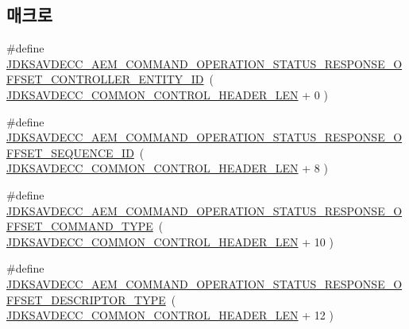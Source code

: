 \subsection*{매크로}
\begin{DoxyCompactItemize}
\item 
\#define \hyperlink{group__command__operation__status__response_ga7ae2781500733544ae98e74ad76cddd2}{J\+D\+K\+S\+A\+V\+D\+E\+C\+C\+\_\+\+A\+E\+M\+\_\+\+C\+O\+M\+M\+A\+N\+D\+\_\+\+O\+P\+E\+R\+A\+T\+I\+O\+N\+\_\+\+S\+T\+A\+T\+U\+S\+\_\+\+R\+E\+S\+P\+O\+N\+S\+E\+\_\+\+O\+F\+F\+S\+E\+T\+\_\+\+C\+O\+N\+T\+R\+O\+L\+L\+E\+R\+\_\+\+E\+N\+T\+I\+T\+Y\+\_\+\+ID}~( \hyperlink{group__jdksavdecc__avtp__common__control__header_gaae84052886fb1bb42f3bc5f85b741dff}{J\+D\+K\+S\+A\+V\+D\+E\+C\+C\+\_\+\+C\+O\+M\+M\+O\+N\+\_\+\+C\+O\+N\+T\+R\+O\+L\+\_\+\+H\+E\+A\+D\+E\+R\+\_\+\+L\+EN} + 0 )
\item 
\#define \hyperlink{group__command__operation__status__response_ga889cc172240f18fde2d9b49d5183cc86}{J\+D\+K\+S\+A\+V\+D\+E\+C\+C\+\_\+\+A\+E\+M\+\_\+\+C\+O\+M\+M\+A\+N\+D\+\_\+\+O\+P\+E\+R\+A\+T\+I\+O\+N\+\_\+\+S\+T\+A\+T\+U\+S\+\_\+\+R\+E\+S\+P\+O\+N\+S\+E\+\_\+\+O\+F\+F\+S\+E\+T\+\_\+\+S\+E\+Q\+U\+E\+N\+C\+E\+\_\+\+ID}~( \hyperlink{group__jdksavdecc__avtp__common__control__header_gaae84052886fb1bb42f3bc5f85b741dff}{J\+D\+K\+S\+A\+V\+D\+E\+C\+C\+\_\+\+C\+O\+M\+M\+O\+N\+\_\+\+C\+O\+N\+T\+R\+O\+L\+\_\+\+H\+E\+A\+D\+E\+R\+\_\+\+L\+EN} + 8 )
\item 
\#define \hyperlink{group__command__operation__status__response_gad5588625099f49153ae793ec49149dbf}{J\+D\+K\+S\+A\+V\+D\+E\+C\+C\+\_\+\+A\+E\+M\+\_\+\+C\+O\+M\+M\+A\+N\+D\+\_\+\+O\+P\+E\+R\+A\+T\+I\+O\+N\+\_\+\+S\+T\+A\+T\+U\+S\+\_\+\+R\+E\+S\+P\+O\+N\+S\+E\+\_\+\+O\+F\+F\+S\+E\+T\+\_\+\+C\+O\+M\+M\+A\+N\+D\+\_\+\+T\+Y\+PE}~( \hyperlink{group__jdksavdecc__avtp__common__control__header_gaae84052886fb1bb42f3bc5f85b741dff}{J\+D\+K\+S\+A\+V\+D\+E\+C\+C\+\_\+\+C\+O\+M\+M\+O\+N\+\_\+\+C\+O\+N\+T\+R\+O\+L\+\_\+\+H\+E\+A\+D\+E\+R\+\_\+\+L\+EN} + 10 )
\item 
\#define \hyperlink{group__command__operation__status__response_ga6ff66386747c7ba6d1bf5da5c3de365e}{J\+D\+K\+S\+A\+V\+D\+E\+C\+C\+\_\+\+A\+E\+M\+\_\+\+C\+O\+M\+M\+A\+N\+D\+\_\+\+O\+P\+E\+R\+A\+T\+I\+O\+N\+\_\+\+S\+T\+A\+T\+U\+S\+\_\+\+R\+E\+S\+P\+O\+N\+S\+E\+\_\+\+O\+F\+F\+S\+E\+T\+\_\+\+D\+E\+S\+C\+R\+I\+P\+T\+O\+R\+\_\+\+T\+Y\+PE}~( \hyperlink{group__jdksavdecc__avtp__common__control__header_gaae84052886fb1bb42f3bc5f85b741dff}{J\+D\+K\+S\+A\+V\+D\+E\+C\+C\+\_\+\+C\+O\+M\+M\+O\+N\+\_\+\+C\+O\+N\+T\+R\+O\+L\+\_\+\+H\+E\+A\+D\+E\+R\+\_\+\+L\+EN} + 12 )

\end{DoxyCompactItemize}
